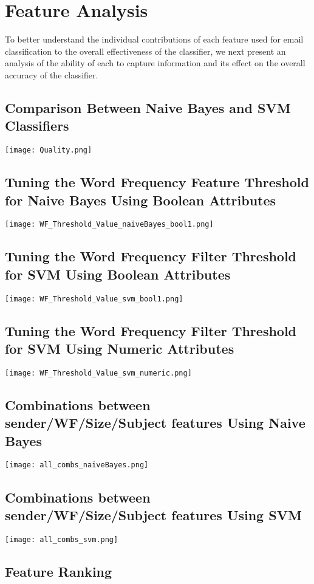 
\chapter{Feature Analysis} %

\label{Chapter6} %



To better understand the individual contributions of each feature used for email classification to the overall eﬀectiveness of the classifier, we next present an analysis of the ability of each to capture information and its effect on the overall accuracy of the classifier.

\section{Comparison Between Naive Bayes and SVM Classifiers}
\texttt{[image: Quality.png]}

\section{Tuning the Word Frequency Feature Threshold for Naive Bayes Using Boolean Attributes}
\texttt{[image: WF\_Threshold\_Value\_naiveBayes\_bool1.png]}

\section{Tuning the Word Frequency Filter Threshold for SVM Using Boolean Attributes}
\texttt{[image: WF\_Threshold\_Value\_svm\_bool1.png]}

\section{Tuning the Word Frequency Filter Threshold for SVM Using Numeric Attributes}
\texttt{[image: WF\_Threshold\_Value\_svm\_numeric.png]}

\section{Combinations between sender/WF/Size/Subject features Using Naive Bayes}
\texttt{[image: all\_combs\_naiveBayes.png]}

\section{Combinations between sender/WF/Size/Subject features Using SVM}
\texttt{[image: all\_combs\_svm.png]}


\section{Feature Ranking}
